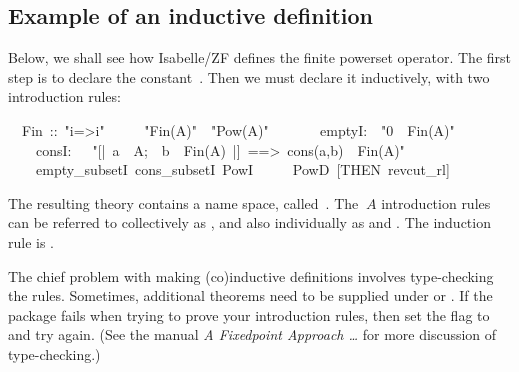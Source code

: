 \subsection{Example of an inductive definition}

Below, we shall see how Isabelle/ZF defines the finite powerset
operator.  The first step is to declare the constant~.  Then we
must declare it inductively, with two introduction rules:
\begin{isabelle}
\ \ Fin\ ::\ "i=>i"\isanewline
{}\isanewline
\ \ \ \ \ "Fin(A)"\ \isasymsubseteq\ "Pow(A)"\isanewline
\ \ \isanewline
\ \ \ \ emptyI:\ \ "0\ \isasymin\ Fin(A)"\isanewline
\ \ \ \ consI:\ \ \ "[|\ a\ \isasymin\ A;\ \ b\ \isasymin\ Fin(A)\ |]\ ==>\ cons(a,b)\ \isasymin\ Fin(A)"\isanewline
\ \ \ \ empty\_subsetI\ cons\_subsetI\ PowI\isanewline
\ \ \ \ \ PowD\ [THEN\ revcut\_rl]\end{isabelle}
The resulting theory contains a name space, called~.
The $~A$ introduction rules can be referred to collectively as
, and also individually as  and
.  The induction rule is .

The chief problem with making (co)inductive definitions involves type-checking
the rules.  Sometimes, additional theorems need to be supplied under
 or .  If the package fails when trying
to prove your introduction rules, then set the flag 
to  and try again.  (See the manual \emph{A Fixedpoint Approach
  \ldots} for more discussion of type-checking.)

